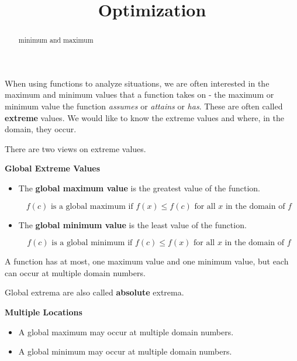 \documentclass{ximera}
\title{Optimization}
\begin{document}
\begin{abstract}
minimum and maximum
\end{abstract}
\maketitle



When using functions to analyze situations, we are often interested in the maximum and minimum values that a function takes on - the maximum or minimum value the function \textit{assumes} or \textit{attains} or \textit{has}. These are often called \textbf{extreme} values. We would like to know the extreme values and where, in the domain, they occur.



There are two views on extreme values.

\begin{definition} \textbf{\textcolor{green!50!black}{Global Extreme Values}} 

\begin{itemize}
\item The \textbf{global maximum value} is the greatest value of the function.  

\[  f(c) \text{ is a global maximum if } f(x) \leq f(c) \text{ for all } x \text{ in the domain of } f \]

\item The \textbf{global minimum value} is the least value of the function.  

\[  f(c) \text{ is a global minimum if } f(c) \leq f(x) \text{ for all } x \text{ in the domain of } f \]
\end{itemize}

A function has at most, one maximum value and one minimum value, but each can occur at multiple domain numbers.

Global extrema are also called \textbf{absolute} extrema.

\end{definition}






\begin{warning} \textbf{\textcolor{red!70!black}{Multiple Locations}}

\begin{itemize}
\item A global maximum may occur at multiple domain numbers.  
\item A global minimum may occur at multiple domain numbers. 
\end{itemize}

\end{warning}
\end{document}

